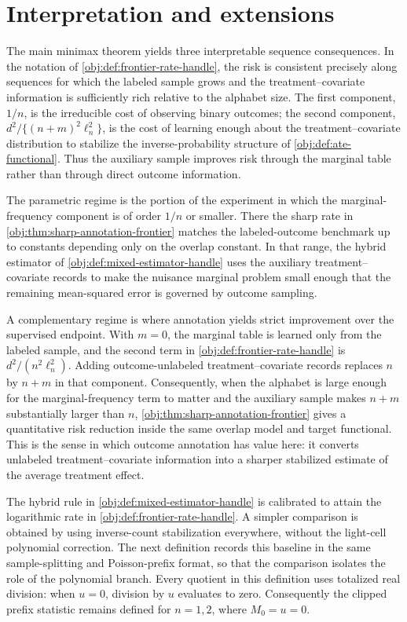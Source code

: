 \section{Interpretation and extensions}\label{sec:interpretation}

The main minimax theorem yields three interpretable sequence consequences. In the notation of \cref{obj:def:frontier-rate-handle}, the risk is consistent precisely along sequences for which the labeled sample grows and the treatment--covariate information is sufficiently rich relative to the alphabet size. The first component, \(1/n\), is the irreducible cost of observing binary outcomes; the second component, \(d^2/\{(n+m)^2\ell_n^2\}\), is the cost of learning enough about the treatment--covariate distribution to stabilize the inverse-probability structure of \cref{obj:def:ate-functional}. Thus the auxiliary sample improves risk through the marginal table rather than through direct outcome information.

The parametric regime is the portion of the experiment in which the marginal-frequency component is of order \(1/n\) or smaller. There the sharp rate in \cref{obj:thm:sharp-annotation-frontier} matches the labeled-outcome benchmark up to constants depending only on the overlap constant. In that range, the hybrid estimator of \cref{obj:def:mixed-estimator-handle} uses the auxiliary treatment--covariate records to make the nuisance marginal problem small enough that the remaining mean-squared error is governed by outcome sampling.

A complementary regime is where annotation yields strict improvement over the supervised endpoint. With \(m=0\), the marginal table is learned only from the labeled sample, and the second term in \cref{obj:def:frontier-rate-handle} is \(d^2/(n^2\ell_n^2)\). Adding outcome-unlabeled treatment--covariate records replaces \(n\) by \(n+m\) in that component. Consequently, when the alphabet is large enough for the marginal-frequency term to matter and the auxiliary sample makes \(n+m\) substantially larger than \(n\), \cref{obj:thm:sharp-annotation-frontier} gives a quantitative risk reduction inside the same overlap model and target functional. This is the sense in which outcome annotation has value here: it converts unlabeled treatment--covariate information into a sharper stabilized estimate of the average treatment effect.

The hybrid rule in \cref{obj:def:mixed-estimator-handle} is calibrated to attain the logarithmic rate in \cref{obj:def:frontier-rate-handle}. A simpler comparison is obtained by using inverse-count stabilization everywhere, without the light-cell polynomial correction. The next definition records this baseline in the same sample-splitting and Poisson-prefix format, so that the comparison isolates the role of the polynomial branch. Every quotient in this definition uses totalized real division: when \(u=0\), division by \(u\) evaluates to zero. Consequently the clipped prefix statistic remains defined for \(n=1,2\), where \(M_0=u=0\).

